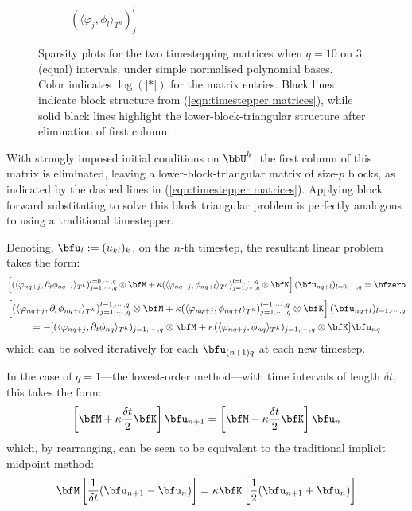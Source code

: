 \begin{example}
\begin{figure}[!ht]
\begin{subfigure}{0.5\textwidth}
                \caption{$(\langle\varphi_{j}, \phi_{l}\rangle_{T^{h}})_{j}^{l}$}
            \end{subfigure}
            \caption{Sparsity plots for the two timestepping matrices when $q = 10$ on 3 (equal) intervals, under simple normalised polynomial bases. \\ Color indicates $\log(|*|)$ for the matrix entries. Black lines indicate block structure from (\ref{eqn:timestepper matrices}), while solid black lines highlight the lower-block-triangular structure after elimination of first column.}
            \label{fig:timestepper matrices}
        \end{figure}

        With strongly imposed initial conditions on $\bbU^{h}$, the first column of this matrix is eliminated, leaving a lower-block-triangular matrix of size-$p$ blocks, as indicated by the dashed lines in (\ref{eqn:timestepper matrices}). Applying block forward substituting to solve this block triangular problem is perfectly analogous to using a traditional timestepper.

        Denoting, $\bfu_{l}  :=  (u_{kl})_{k}$, on the $n$-th timestep, the resultant linear problem takes the form:
        \begin{equation}
            \left[(\langle\varphi_{nq + j}, \partial_{t}\phi_{nq + l}\rangle_{T^{h}})_{j = 1, \cdots, q}^{l = 0, \cdots, q}\otimes\bfM + \kappa(\langle\varphi_{nq + j}, \phi_{nq + l}\rangle_{T^{h}})_{j = 1, \cdots, q}^{l = 0, \cdots, q}\otimes\bfK\right](\bfu_{nq + l})_{l = 0, \cdots, q}  =  \bfzero
        \end{equation}
        \begin{multline}
            \left[(\langle\varphi_{nq + j}, \partial_{t}\phi_{nq + l}\rangle_{T^{h}})_{j = 1, \cdots, q}^{l = 1, \cdots, q}\otimes\bfM + \kappa(\langle\varphi_{nq + j}, \phi_{nq + l}\rangle_{T^{h}})_{j = 1, \cdots, q}^{l = 1, \cdots, q}\otimes\bfK\right](\bfu_{nq + l})_{l = 1, \cdots, q}  \\
            =  - [(\langle\varphi_{nq + j}, \partial_{t}\phi_{nq}\rangle_{T^{h}})_{j = 1, \cdots, q}\otimes\bfM + \kappa(\langle\varphi_{nq + j}, \phi_{nq}\rangle_{T^{h}})_{j = 1, \cdots, q}\otimes\bfK]\bfu_{nq}
        \end{multline}
        which can be solved iteratively for each $\bfu_{(n + 1)q}$ at each new timestep.

        In the case of $q = 1$—the lowest-order method—with time intervals of length $\delta t$, this takes the form:
        \begin{equation}
            \left[\bfM + \kappa\frac{\delta t}{2}\bfK\right]\bfu_{n + 1}  =  \left[\bfM - \kappa\frac{\delta t}{2}\bfK\right]\bfu_{n}
        \end{equation}
        which, by rearranging, can be seen to be equivalent to the traditional implicit midpoint method:
        \begin{equation}
            \bfM\left[\frac{1}{\delta t}(\bfu_{n + 1} - \bfu_{n})\right]  =  \kappa\bfK\left[\frac{1}{2}(\bfu_{n + 1} + \bfu_{n})\right]
        \end{equation}
    \end{example}
    \line

    
